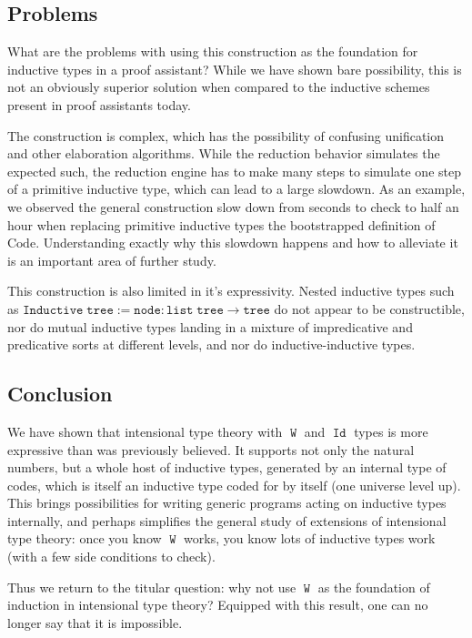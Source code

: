 \documentclass[a4paper,UKenglish,cleveref,nameinlink,autoref,thm-restate]{lipics-v2019}
\DeclareMathOperator{\W}{\mathtt{W}}
\DeclareMathOperator{\Idop}{\mathtt{Id}}
\newcommand{\Code}{\mathrm{Code}}
\begin{document}
\subsection{Problems}
What are the problems with using this construction as the foundation for inductive types in a proof assistant? While we have shown bare possibility, this is not an obviously superior solution when compared to the inductive schemes present in proof assistants today.

The construction is complex, which has the possibility of confusing unification and other elaboration algorithms. While the reduction behavior simulates the expected such, the reduction engine has to make many steps to simulate one step of a primitive inductive type, which can lead to a large slowdown. As an example, we observed the general construction slow down from seconds to check to half an hour when replacing primitive inductive types the bootstrapped definition of $\Code$. Understanding exactly why this slowdown happens and how to alleviate it is an important area of further study.

This construction is also limited in it's expressivity. Nested inductive types such as $\mathtt{Inductive}\;\mathtt{tree} := \mathtt{node} : \mathtt{list}\;\mathtt{tree} \to \mathtt{tree}$ do not appear to be constructible, nor do mutual inductive types landing in a mixture of impredicative and predicative sorts at different levels, and nor do inductive-inductive types.

\subsection{Conclusion}

We have shown that intensional type theory with $\W$ and $\Idop$ types is more expressive than was previously believed. It supports not only the natural numbers, but a whole host of inductive types, generated by an internal type of codes, which is itself an inductive type coded for by itself (one universe level up). This brings possibilities for writing generic programs acting on inductive types internally, and perhaps simplifies the general study of extensions of intensional type theory: once you know $\W$ works, you know lots of inductive types work (with a few side conditions to check).

Thus we return to the titular question: why not use $\W$ as the foundation of induction in intensional type theory? Equipped with this result, one can no longer say that it is impossible.





\appendix
\end{document}
